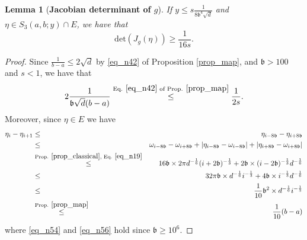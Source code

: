 \documentclass[11pt,letterpaper]{article}
\newtheorem{lemma}[theorem]{Lemma}
\begin{document}
\begin{lemma}[\bf Jacobian determinant of $g$]\label{prop_Jacobian}
If  $y \leq s\frac{1}{8\mathfrak{b}^4\sqrt{d} }$ and $\eta \in  S_3(a,b;y) \cap E$, we have that
%
$$\mathrm{det}(J_g(\eta)) \geq \frac{1}{16 s}.$$
\end{lemma}
\begin{proof}
%
%


    Since $\frac{1}{b-a} \leq 2 \sqrt{d}$ by \eqref{eq_n42} of Proposition \ref{prop_map},  and $\mathfrak{b} > 100$ and $s<1$, we have that
%
\begin{equation}\label{eq_n29}
    2\frac{1}{\mathfrak{b}\sqrt{d} (b-a)} \stackrel{\textrm{Eq. } \eqref{eq_n42}  \textrm{ of Prop. } \ref{prop_map}}{\leq} \frac{1}{2s}.
\end{equation}
%
    Moreover, since $\eta \in E$ we have
%
\begin{eqnarray}
\eta_{i} - \eta_{i+1} &\leq&    \eta_{i - 8\mathfrak{b}} - \eta_{i + 8\mathfrak{b}} \nonumber\\
%
&\leq&  \omega_{i - 8\mathfrak{b}} - \omega_{i + 8\mathfrak{b}} + |\eta_{i - 8\mathfrak{b}} - \omega_{i - 8\mathfrak{b}}|  + |\eta_{i + 8\mathfrak{b}} - \omega_{i + 8\mathfrak{b}}| \nonumber\\
%
&\stackrel{\textrm{Prop. } \ref{prop_classical}, \, \, \textrm{Eq. } \eqref{eq_n19}}{\leq}&  16 \mathfrak{b}\times 2 \pi  d^{-\frac{1}{6}}  (i+2\mathfrak{b})^{-\frac{1}{3}} + 2 \mathfrak{b} \times (i-2\mathfrak{b})^{-\frac{1}{3}} d^{-\frac{1}{6}} \nonumber\\
%
&\leq& 32 \pi \mathfrak{b}\times  d^{-\frac{1}{6}}  i^{-\frac{1}{3}} + 4 \mathfrak{b} \times i^{-\frac{1}{3}} d^{-\frac{1}{6}} \label{eq_n54}\\
%
&\leq&  \frac{1}{10} \mathfrak{b}^2 \times d^{-\frac{1}{6}} i^{-\frac{1}{3}}  \label{eq_n56}\\
%
&\stackrel{\textrm{Prop. } \ref{prop_map}}{\leq}& \frac{1}{10}(b-a)  \label{eq_n57}
\end{eqnarray}
%
where \eqref{eq_n54} and \eqref{eq_n56} hold since $\mathfrak{b} \geq 10^6$.


\end{proof}
\end{document}
